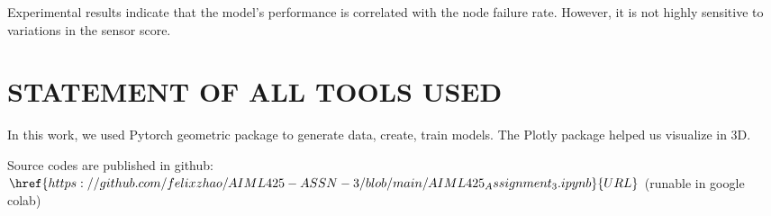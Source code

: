 \documentclass{article}
\begin{document}
Experimental results indicate that the model's performance is correlated with the node failure rate. However, it is not highly sensitive to variations in the sensor score.

\section{STATEMENT OF ALL TOOLS USED}
\label{sec:statementofalltoolsused}

In this work, we used Pytorch geometric package to generate data, create, train models. 
The Plotly package helped us visualize in 3D. 

Source codes are published in github: 
$\href{https://github.com/felixzhao/AIML425-ASSN-3/blob/main/AIML425_Assignment_3.ipynb}{URL}$
 (runable in google colab)






\vfill\pagebreak



\end{document}
